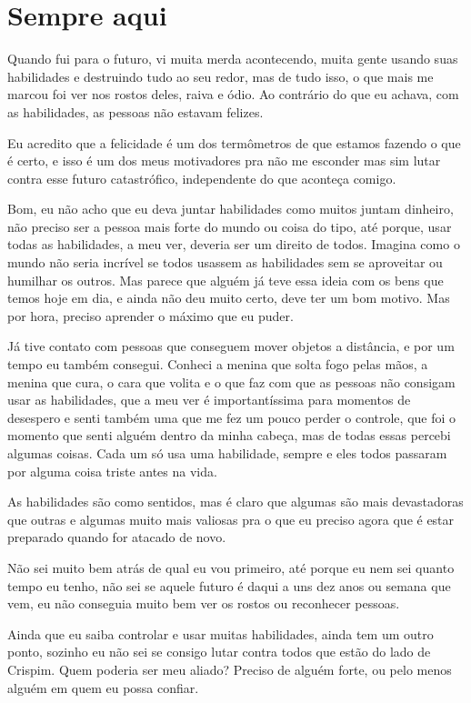 \chapter{Sempre aqui}
Quando fui para o futuro, vi muita merda acontecendo, muita gente usando suas habilidades e destruindo tudo ao seu redor, mas de tudo isso, o que mais me marcou foi ver nos rostos deles, raiva e ódio. Ao contrário do que eu achava, com as habilidades, as pessoas não estavam felizes.

Eu acredito que a felicidade é um dos termômetros de que estamos fazendo o que é certo, e isso é um dos meus motivadores pra não me esconder mas sim lutar contra esse futuro catastrófico, independente do que aconteça comigo.

Bom, eu não acho que eu deva juntar habilidades como muitos juntam dinheiro, não preciso ser a pessoa mais forte do mundo ou coisa do tipo, até porque, usar todas as habilidades, a meu ver, deveria ser um direito de todos. Imagina como o mundo não seria incrível se todos usassem as habilidades sem se aproveitar ou humilhar os outros. Mas parece que alguém já teve essa ideia com os bens que temos hoje em dia, e ainda não deu muito certo, deve ter um bom motivo. Mas por hora, preciso aprender o máximo que eu puder.

Já tive contato com pessoas que conseguem mover objetos a distância, e por um tempo eu também consegui. Conheci a menina que solta fogo pelas mãos, a menina que cura, o cara que volita e o que faz com que as pessoas não consigam usar as habilidades, que a meu ver é importantíssima para momentos de desespero e senti também uma que me fez um pouco perder o controle, que foi o momento que senti alguém dentro da minha cabeça, mas de todas essas percebi algumas coisas. Cada um só usa uma habilidade, sempre e eles todos passaram por alguma coisa triste antes na vida.

As habilidades são como sentidos, mas é claro que algumas são mais devastadoras que outras e algumas muito mais valiosas pra o que eu preciso agora que é estar preparado quando for atacado de novo.

Não sei muito bem atrás de qual eu vou primeiro, até porque eu nem sei quanto tempo eu tenho, não sei se aquele futuro é daqui a uns dez anos ou semana que vem, eu não conseguia muito bem ver os rostos ou reconhecer pessoas.

Ainda que eu saiba controlar e usar muitas habilidades, ainda tem um outro ponto, sozinho eu não sei se consigo lutar contra todos que estão do lado de Crispim. Quem poderia ser meu aliado? Preciso de alguém forte, ou pelo menos alguém em quem eu possa confiar.

